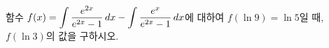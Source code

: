 함수 $f(x)=\displaystyle\int\dfrac{e^{2x}}{e^{2x}-1}\mkern3mu dx-\int\dfrac{e^x}{e^{2x}-1}\mkern3mu dx$에 대하여 $f(\ln 9)=\ln 5$일 때, $f(\ln 3)$의 값을 구하시오.
